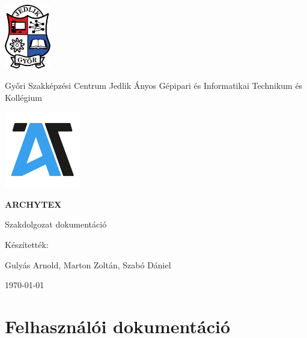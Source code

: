 \documentclass[12pt]{article}
\begin{document}
\begin{titlepage}
  \centering
  \includegraphics[width=0.15\textwidth]{images/jedlik_logo.png}\par\vspace{1cm}
  {\Large Győri Szakképzési Centrum Jedlik Ányos Gépipari és Informatikai Technikum és Kollégium\par}
  \vspace{2cm}
  \includegraphics[width=0.25\textwidth]{images/archytex_logo.png}\par\vspace{1cm}
  {\huge\sffamily\textbf{ARCHYTEX}\par}
  \vspace{1cm}
  {\Large Szakdolgozat dokumentáció\par}
  \vfill
  Készítették:\par
  Gulyás Arnold, Marton Zoltán, Szabó Dániel

  \vfill

  \vfill
  {\large \today\par}
\end{titlepage}

\thispagestyle{empty}

\thispagestyle{empty}



\tableofcontents



\part{Felhasználói dokumentáció}
\rhead{}


\end{document}
